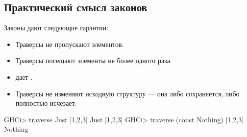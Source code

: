 \documentclass[11pt,a4paper]{article}
\begin{document}
\subsection{Практический смысл законов}
Законы  дают следующие гарантии:
\begin{itemize}
	\item Траверсы не пропускают элементов.
	\item Траверсы посещают элементы не более одного раза. 
	\item {} дает .
	\item Траверсы не изменяют исходную структуру --- она либо сохраняется, либо полностью исчезает.
\end{itemize}
\begin{hscode}
GHCi> traverse Just [1,2,3]
Just [1,2,3]
GHCi> traverse (const Nothing) [1,2,3]
Nothing
\end{hscode}
\end{document}
